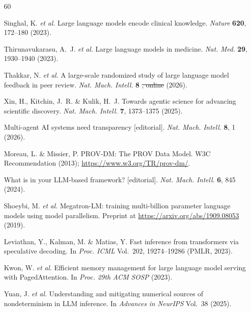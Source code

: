 \documentclass[sn-nature]{sn-jnl}
\makeatletter
\providecommand{\DIFadd}[1]{{\protect\color{blue}\uwave{#1}}} %
\providecommand{\DIFdel}[1]{{\protect\color{red}\sout{#1}}} %
\providecommand{\DIFaddbegin}{} %
\providecommand{\DIFaddend}{} %
\providecommand{\DIFdelbegin}{} %
\providecommand{\DIFdelend}{} %
\providecommand{\DIFscaledelfig}{0.5}
\newlength{\DIFdelgraphicswidth} %
\newlength{\DIFdelgraphicsheight} %
\providecommand{\DIFaddincludegraphics}[2][]{{\color{blue}\fbox{\DIFOincludegraphics[#1]{#2}}}} %
\providecommand{\DIFdelincludegraphics}[2][]{%
\sbox{\DIFdelgraphicsbox}{\DIFOincludegraphics[#1]{#2}}%
\settoboxwidth{\DIFdelgraphicswidth}{\DIFdelgraphicsbox} %
\settoboxtotalheight{\DIFdelgraphicsheight}{\DIFdelgraphicsbox} %
\scalebox{\DIFscaledelfig}{%
\parbox[b]{\DIFdelgraphicswidth}{\usebox{\DIFdelgraphicsbox}\\[-\baselineskip] \rule{\DIFdelgraphicswidth}{0em}}\llap{\resizebox{\DIFdelgraphicswidth}{\DIFdelgraphicsheight}{%
\setlength{\unitlength}{\DIFdelgraphicswidth}%
\begin{picture}(1,1)%
\thicklines\linethickness{2pt} %
{\color[rgb]{1,0,0}\put(0,0){\framebox(1,1){}}}%
{\color[rgb]{1,0,0}\put(0,0){\line( 1,1){1}}}%
{\color[rgb]{1,0,0}\put(0,1){\line(1,-1){1}}}%
\end{picture}%
}\hspace*{3pt}}} %
} %
\DeclareRobustCommand{\DIFaddbegin}{\DIFOaddbegin \let\includegraphics\DIFaddincludegraphics} %
\DeclareRobustCommand{\DIFaddend}{\DIFOaddend \let\includegraphics\DIFOincludegraphics} %
\DeclareRobustCommand{\DIFdelbegin}{\DIFOdelbegin \let\includegraphics\DIFdelincludegraphics} %
\DeclareRobustCommand{\DIFdelend}{\DIFOaddend \let\includegraphics\DIFOincludegraphics} %
\let\sout@orig\sout %
\renewcommand{\sout}[1]{\ifmmode\text{\sout@orig{\ensuremath{#1}}}\else\sout@orig{#1}\fi} %
\makeatother
\begin{document}
\DIFdelbegin %
\DIFdelend \DIFaddbegin \begin{thebibliography}{60}
\DIFaddend 

Singhal, K. \emph{et al.}
Large language models encode clinical knowledge.
\emph{Nature} \textbf{620}, 172--180 (2023).

Thirunavukarasu, A.~J. \emph{et al.}
Large language models in medicine.
\emph{Nat. Med.} \textbf{29}, 1930--1940 (2023).

Thakkar, N. \emph{et al.}
A large-scale randomized study of large language model feedback in peer review.
\emph{Nat. Mach. Intell.} \textbf{8} \DIFdelbegin \DIFdel{, online }\DIFdelend (2026). \DIFaddbegin \DIFadd{Advance online publication.
}\DIFaddend 

Xin, H., Kitchin, J.~R. \& Kulik, H.~J.
Towards agentic science for advancing scientific discovery.
\emph{Nat. Mach. Intell.} \textbf{7}, 1373--1375 (2025).

Multi-agent AI systems need transparency [editorial].
\emph{Nat. Mach. Intell.} \textbf{8}, 1 (2026).

Moreau, L. \& Missier, P.
PROV-DM: The PROV Data Model.
W3C Recommendation (2013); \url{https://www.w3.org/TR/prov-dm/}.

What is in your LLM-based framework? [editorial].
\emph{Nat. Mach. Intell.} \textbf{6}, 845 (2024).

Shoeybi, M. \emph{et al.}
Megatron-LM: training multi-billion parameter language models using model parallelism.
Preprint at \url{https://arxiv.org/abs/1909.08053} (2019).

Leviathan, Y., Kalman, M. \& Matias, Y.
Fast inference from transformers via speculative decoding.
In \emph{Proc. ICML} Vol.~202, 19274--19286 (PMLR, 2023).

Kwon, W. \emph{et al.}
Efficient memory management for large language model serving with PagedAttention.
In \emph{Proc. 29th ACM SOSP} (2023).

Yuan, J. \emph{et al.}
Understanding and mitigating numerical sources of nondeterminism in LLM inference.
In \emph{Advances in NeurIPS} Vol.~38 (2025).


\end{thebibliography}
\end{document}
